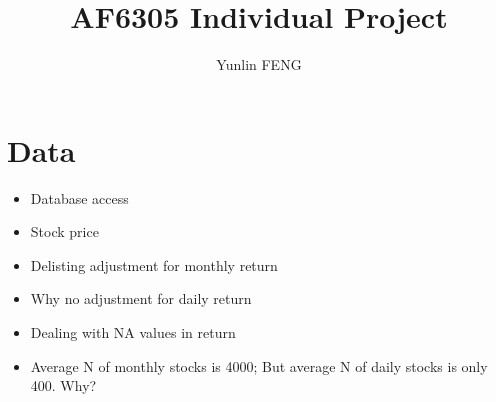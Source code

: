 \documentclass{article}
\author{Yunlin FENG}
\title{AF6305 Individual Project}
\begin{document}
\maketitle

\section{Data}

\begin{itemize}
  \item Database access
  \item Stock price
  \item Delisting adjustment for monthly return
  \item Why no adjustment for daily return
  \item Dealing with NA values in return
  \item Average N of monthly stocks is 4000; But average N of daily stocks is only 400. Why?
\end{itemize}
\end{document}
